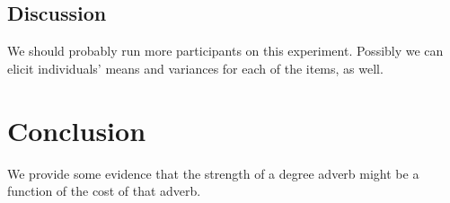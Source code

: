 \documentclass[10pt,letterpaper]{article}
\begin{document}
  \subsection{Discussion}
  
  We should probably run more participants on this experiment. Possibly we can elicit individuals' means and variances for each of the items, as well.
  
  \section{Conclusion}
  
  We provide some evidence that the strength of a degree adverb might be a function of the cost of that adverb.

% 
% 
% 
% 
%   
%   
%   
\end{document}
